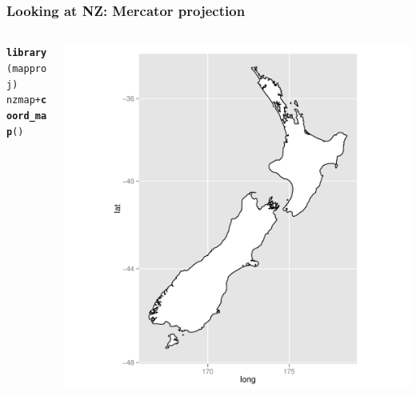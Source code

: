 \documentclass{beamer}\usepackage{graphicx, color}
\makeatletter
\def\maxwidth{ %
  \ifdim\Gin@nat@width>\linewidth
    \linewidth
  \else
    \Gin@nat@width
  \fi
}
\newcommand{\hlfunctioncall}[1]{\textcolor[rgb]{0.501960784313725,0,0.329411764705882}{\textbf{#1}}}%
\newenvironment{kframe}{%
 \def\at@end@of@kframe{}%
 \ifinner\ifhmode%
  \def\at@end@of@kframe{\end{minipage}}%
  \begin{minipage}{\columnwidth}%
 \fi\fi%
 \def\FrameCommand##1{\hskip\@totalleftmargin \hskip-\fboxsep
 \colorbox{shadecolor}{##1}\hskip-\fboxsep
     \hskip-\linewidth \hskip-\@totalleftmargin \hskip\columnwidth}%
 \MakeFramed {\advance\hsize-\width
   \@totalleftmargin\z@ \linewidth\hsize
   \@setminipage}}%
 {\par\unskip\endMakeFramed%
 \at@end@of@kframe}
\newenvironment{knitrout}{}{} %
\makeatother
\begin{document}
\begin{frame}[fragile]
  \frametitle{Looking at NZ: Mercator projection}
  \begin{columns}
    \begin{column}{0.3\textwidth}
\begin{knitrout}\scriptsize
{}\color{fgcolor}\begin{kframe}
\begin{alltt}
\hlfunctioncall{library}(mapproj)
nzmap + \hlfunctioncall{coord_map}()
\end{alltt}
\end{kframe}
\end{knitrout}

    \end{column}
    \begin{column}{0.7\textwidth}
\begin{knitrout}\scriptsize
{}\color{fgcolor}
\includegraphics[width=\maxwidth]{figure/unnamed-chunk-7} 

\end{knitrout}

    \end{column}
  \end{columns}
\end{frame}
\end{document}
